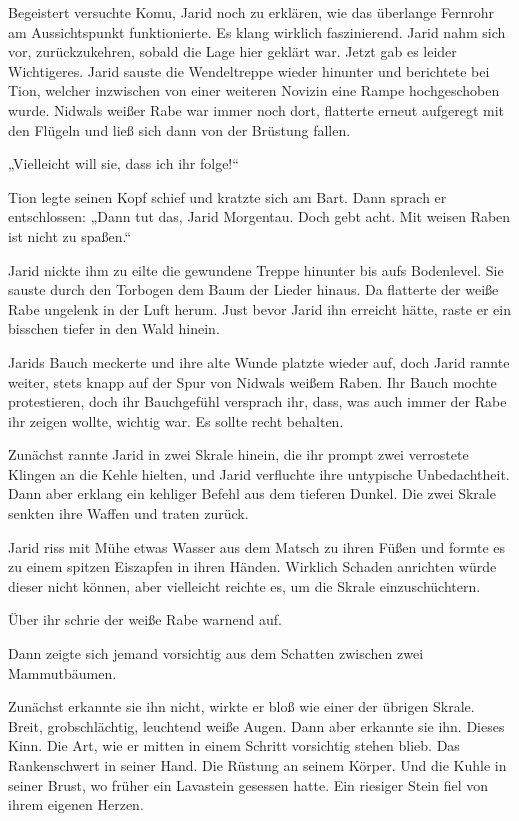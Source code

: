 Begeistert versuchte Komu, Jarid noch zu erklären, wie das überlange Fernrohr am Aussichtspunkt funktionierte. Es klang wirklich faszinierend. Jarid nahm sich vor, zurückzukehren, sobald die Lage hier geklärt war. Jetzt gab es leider Wichtigeres. Jarid sauste die Wendeltreppe wieder hinunter und berichtete bei Tion, welcher inzwischen von einer weiteren Novizin eine Rampe hochgeschoben wurde. Nidwals weißer Rabe war immer noch dort, flatterte erneut aufgeregt mit den Flügeln und ließ sich dann von der Brüstung fallen.

„Vielleicht will sie, dass ich ihr folge!“

Tion legte seinen Kopf schief und kratzte sich am Bart. Dann sprach er entschlossen: „Dann tut das, Jarid Morgentau. Doch gebt acht. Mit weisen Raben ist nicht zu spaßen.“

Jarid nickte ihm zu eilte die gewundene Treppe hinunter bis aufs Bodenlevel. Sie sauste durch den Torbogen dem Baum der Lieder hinaus. Da flatterte der weiße Rabe ungelenk in der Luft herum. Just bevor Jarid ihn erreicht hätte, raste er ein bisschen tiefer in den Wald hinein.

Jarids Bauch meckerte und ihre alte Wunde platzte wieder auf, doch Jarid rannte weiter, stets knapp auf der Spur von Nidwals weißem Raben. Ihr Bauch mochte protestieren, doch ihr Bauchgefühl versprach ihr, dass, was auch immer der Rabe ihr zeigen wollte, wichtig war. Es sollte recht behalten.

Zunächst rannte Jarid in zwei Skrale hinein, die ihr prompt zwei verrostete Klingen an die Kehle hielten, und Jarid verfluchte ihre untypische Unbedachtheit. Dann aber erklang ein kehliger Befehl aus dem tieferen Dunkel. Die zwei Skrale senkten ihre Waffen und traten zurück.

Jarid riss mit Mühe etwas Wasser aus dem Matsch zu ihren Füßen und formte es zu einem spitzen Eiszapfen in ihren Händen. Wirklich Schaden anrichten würde dieser nicht können, aber vielleicht reichte es, um die Skrale einzuschüchtern.

Über ihr schrie der weiße Rabe warnend auf.

Dann zeigte sich jemand vorsichtig aus dem Schatten zwischen zwei Mammutbäumen.

Zunächst erkannte sie ihn nicht, wirkte er bloß wie einer der übrigen Skrale. Breit, grobschlächtig, leuchtend weiße Augen. Dann aber erkannte sie ihn. Dieses Kinn. Die Art, wie er mitten in einem Schritt vorsichtig stehen blieb. Das Rankenschwert in seiner Hand. Die Rüstung an seinem Körper. Und die Kuhle in seiner Brust, wo früher ein Lavastein gesessen hatte. Ein riesiger Stein fiel von ihrem eigenen Herzen.

